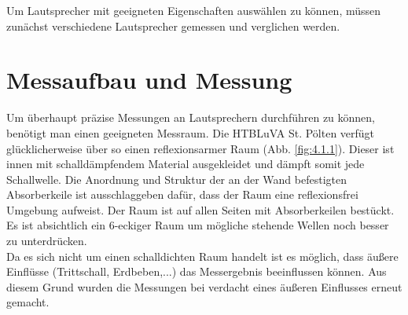 
Um Lautsprecher mit geeigneten Eigenschaften auswählen zu können, müssen zunächst verschiedene Lautsprecher gemessen und verglichen werden.

\section{Messaufbau und Messung}\label{sec:4.1}
Um überhaupt präzise Messungen an Lautsprechern durchführen zu können, benötigt man einen geeigneten Messraum.
Die HTBLuVA St. Pölten verfügt glücklicherweise über so einen reflexionsarmer Raum (Abb. \ref{fig:4.1.1}).
Dieser ist innen mit schalldämpfendem Material ausgekleidet und dämpft somit jede Schallwelle.
Die Anordnung und Struktur der an der Wand befestigten Absorberkeile ist ausschlaggeben dafür, dass der Raum eine reflexionsfrei Umgebung aufweist.
Der Raum ist auf allen Seiten mit Absorberkeilen bestückt.
Es ist absichtlich ein 6-eckiger Raum um mögliche stehende Wellen noch besser zu unterdrücken.\\
Da es sich nicht um einen schalldichten Raum handelt ist es möglich, dass äußere Einflüsse (Trittschall, Erdbeben,...) das Messergebnis beeinflussen können.
Aus diesem Grund wurden die Messungen bei verdacht eines äußeren Einflusses erneut gemacht.

